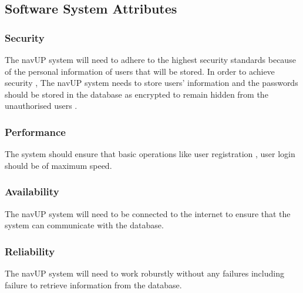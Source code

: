 \subsection{Software System Attributes}

	\subsubsection{Security}
	The navUP system will need to adhere to the highest security standards because of the personal information of users that will be stored. In order to achieve security , The navUP system needs to store users’ information and the passwords should be stored in the database as encrypted to remain hidden from the unauthorised users  .
	\subsubsection{Performance}
	The system should ensure that basic operations like user registration , user login should be of maximum speed. 
	\subsubsection{Availability}
	The navUP system will need to be connected to the internet to ensure that the system can communicate with  the database.
	\subsubsection{Reliability}
	The navUP system will need to work roburstly without any failures including failure to retrieve information from the database.

